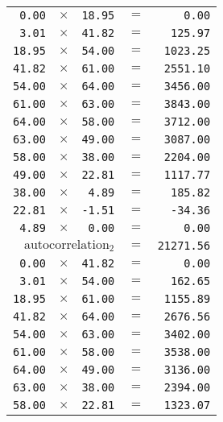 {\begin{multicols}{2}
\begin{tabular}{rrrrr}
  \texttt{0.00} & $\times$ & \texttt{18.95} & $=$ & \texttt{0.00} \\
  \texttt{3.01} & $\times$ & \texttt{41.82} & $=$ & \texttt{125.97} \\
  \texttt{18.95} & $\times$ & \texttt{54.00} & $=$ & \texttt{1023.25} \\
  \texttt{41.82} & $\times$ & \texttt{61.00} & $=$ & \texttt{2551.10} \\
  \texttt{54.00} & $\times$ & \texttt{64.00} & $=$ & \texttt{3456.00} \\
  \texttt{61.00} & $\times$ & \texttt{63.00} & $=$ & \texttt{3843.00} \\
  \texttt{64.00} & $\times$ & \texttt{58.00} & $=$ & \texttt{3712.00} \\
  \texttt{63.00} & $\times$ & \texttt{49.00} & $=$ & \texttt{3087.00} \\
  \texttt{58.00} & $\times$ & \texttt{38.00} & $=$ & \texttt{2204.00} \\
  \texttt{49.00} & $\times$ & \texttt{22.81} & $=$ & \texttt{1117.77} \\
  \texttt{38.00} & $\times$ & \texttt{4.89} & $=$ & \texttt{185.82} \\
  \texttt{22.81} & $\times$ & \texttt{-1.51} & $=$ & \texttt{-34.36} \\
  \texttt{4.89} & $\times$ & \texttt{0.00} & $=$ & \texttt{0.00} \\
  \hline
  \multicolumn{3}{r}{$\text{autocorrelation}_2$} & $=$ & \texttt{21271.56} \\
  \hline
  \hline
  \texttt{0.00} & $\times$ & \texttt{41.82} & $=$ & \texttt{0.00} \\
  \texttt{3.01} & $\times$ & \texttt{54.00} & $=$ & \texttt{162.65} \\
  \texttt{18.95} & $\times$ & \texttt{61.00} & $=$ & \texttt{1155.89} \\
  \texttt{41.82} & $\times$ & \texttt{64.00} & $=$ & \texttt{2676.56} \\
  \texttt{54.00} & $\times$ & \texttt{63.00} & $=$ & \texttt{3402.00} \\
  \texttt{61.00} & $\times$ & \texttt{58.00} & $=$ & \texttt{3538.00} \\
  \texttt{64.00} & $\times$ & \texttt{49.00} & $=$ & \texttt{3136.00} \\
  \texttt{63.00} & $\times$ & \texttt{38.00} & $=$ & \texttt{2394.00} \\
  \texttt{58.00} & $\times$ & \texttt{22.81} & $=$ & \texttt{1323.07} \\

\end{tabular}
\end{multicols}}
